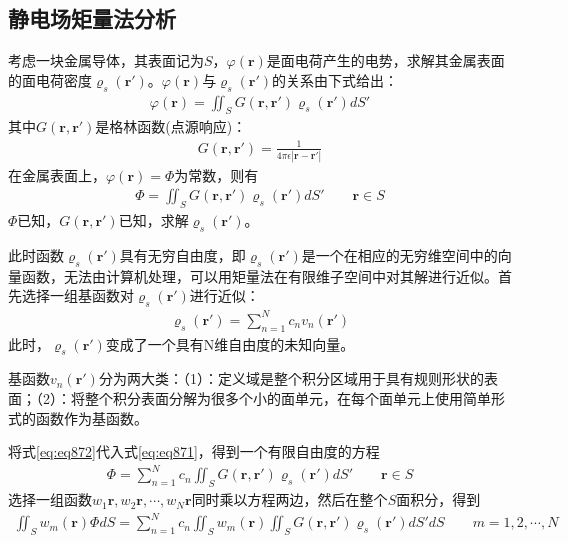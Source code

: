 \documentclass{article}
\numberwithin{equation}{section}
\renewcommand{\vec}[1]{\boldsymbol{#1}}
\begin{document}
\subsection{静电场矩量法分析}
考虑一块金属导体，其表面记为$S$，$\varphi(\vec{r})$是面电荷产生的电势，求解其金属表面的面电荷密度$\varrho _s(\vec{r}')$。$\varphi(\vec{r})$与$\varrho _s(\vec{r}')$的关系由下式给出：
\begin{align}
    \label{eq:eq869}
    \varphi(\vec{r})=\iint_SG(\vec{r},\vec{r}')\varrho _s(\vec{r}')dS'
\end{align}
其中$G(\vec{r},\vec{r}')$是格林函数(点源响应)：
\begin{align}
    \label{eq:eq870}
    G(\vec{r},\vec{r}')=\frac{1}{4\pi\epsilon|\vec{r}-\vec{r}'|}
\end{align}
在金属表面上，$\varphi(\vec{r})=\Phi$为常数，则有
\begin{align}
    \label{eq:eq871}
    \Phi=\iint_SG(\vec{r},\vec{r}')\varrho _s(\vec{r}')dS'\qquad\vec{r}\in S
\end{align}
$\Phi$已知，$G(\vec{r},\vec{r}')$已知，求解$\varrho _s(\vec{r}')$。\par
此时函数$\varrho _s(\vec{r}')$具有无穷自由度，即$\varrho _s(\vec{r}')$是一个在相应的无穷维空间中的向量函数，无法由计算机处理，可以用矩量法在有限维子空间中对其解进行近似。首先选择一组基函数对$\varrho _s(\vec{r}')$进行近似：
\begin{align}
    \label{eq:eq872}
    \varrho _s(\vec{r}')=\sum_{n=1}^{N}c_nv_n(\vec{r}')
\end{align}
此时，$\varrho _s(\vec{r}')$变成了一个具有N维自由度的未知向量。\par
基函数$v_n(\vec{r}')$分为两大类：（1）\textbf{\color{blue}{全域基函数}}：定义域是整个积分区域用于具有规则形状的表面；（2）\textbf{\color{blue}{分域基函数}}：将整个积分表面分解为很多个小的面单元，在每个面单元上使用简单形式的函数作为基函数。\par
将式\ref{eq:eq872}代入式\ref{eq:eq871}，得到一个有限自由度的方程
\begin{align}
    \label{eq:eq877}
    \Phi=\sum_{n=1}^{N}c_n\iint_SG(\vec{r},\vec{r}')\varrho _s(\vec{r}')dS'\qquad\vec{r}\in S
\end{align}
选择一组函数$w_1{\vec{r}},w_2{\vec{r}},\cdots,w_N{\vec{r}}$同时乘以方程两边，然后在整个$S$面积分，得到
\begin{align}
    \label{eq:eq873}
    \iint_Sw_m(\vec{r})\Phi dS=\sum_{n=1}^{N}c_n\iint_Sw_m(\vec{r})\iint_SG(\vec{r},\vec{r}')\varrho _s(\vec{r}')dS'dS\qquad m=1,2,\cdots,N
\end{align}
\end{document}
